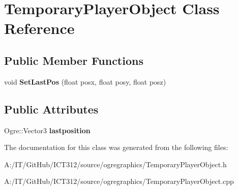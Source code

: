 \hypertarget{class_temporary_player_object}{\section{Temporary\-Player\-Object Class Reference}
\label{class_temporary_player_object}
}
\subsection*{Public Member Functions}
\begin{DoxyCompactItemize}
\item 
\hypertarget{class_temporary_player_object_af3be5d8902a89f95880ee913e77f4de4}{void {\bfseries Set\-Last\-Pos} (float posx, float posy, float posz)}\label{class_temporary_player_object_af3be5d8902a89f95880ee913e77f4de4}

\end{DoxyCompactItemize}
\subsection*{Public Attributes}
\begin{DoxyCompactItemize}
\item 
\hypertarget{class_temporary_player_object_a75290f421231aee09006f2caee75283e}{Ogre\-::\-Vector3 {\bfseries lastposition}}\label{class_temporary_player_object_a75290f421231aee09006f2caee75283e}

\end{DoxyCompactItemize}


The documentation for this class was generated from the following files\-:\begin{DoxyCompactItemize}
\item 
A\-:/\-I\-T/\-Git\-Hub/\-I\-C\-T312/source/ogregraphics/Temporary\-Player\-Object.\-h\item 
A\-:/\-I\-T/\-Git\-Hub/\-I\-C\-T312/source/ogregraphics/Temporary\-Player\-Object.\-cpp\end{DoxyCompactItemize}

